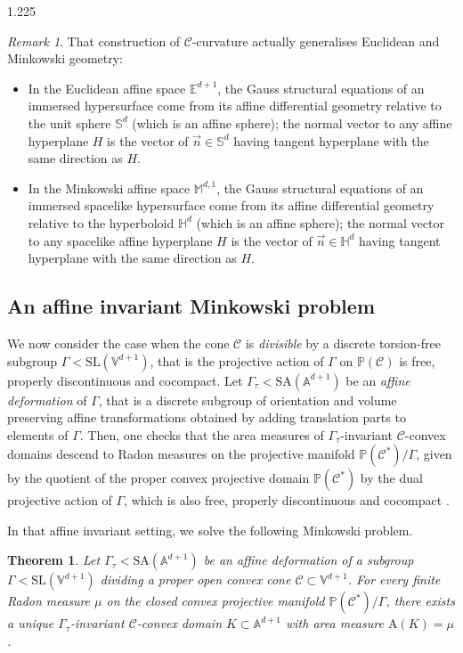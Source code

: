 \documentclass[reqno, a4paper]{amsart}
\numberwithin{equation}{section}
\numberwithin{figure}{section}
\newtheorem{maintheorem}{Theorem}
\theoremstyle{definition}
\theoremstyle{remark}
\newtheorem{remark}[theorem]{Remark}
\newcommand{\V}{\mathbb{V}} %
\newcommand{\A}{\mathbb{A}} %
\renewcommand{\P}{\mathbb{P}} %
\newcommand{\E}{\mathbb{E}} %
\newcommand{\Sph}{\mathbb{S}} %
\renewcommand{\H}{\mathbb{H}} %
\newcommand{\SL}{\mathrm{SL}} %
\newcommand{\SA}{\mathrm{SA}} %
\newcommand{\C}{\mathcal{C}} %
\newcommand{\Area}{\mathrm{A}} %
\begin{document}
\begin{spacing}{1.225}
\begin{remark}
\label{rem intro curvature}
That construction of $\C$-curvature actually generalises Euclidean and Minkowski geometry: 
\begin{itemize}
 \item In the Euclidean affine space $\E^{d+1}$, the Gauss structural equations of an immersed hypersurface come from its affine differential geometry relative to the unit sphere $\Sph^d$ (which is an affine sphere); the normal vector to any affine hyperplane $H$ is the vector of $\vec{n} \in \Sph^d$ having tangent hyperplane with the same direction as $H$. 
 \item In the Minkowski affine space $\mathbb{M}^{d,1}$, the Gauss structural equations of an immersed spacelike hypersurface come from its affine differential geometry relative to the hyperboloid $\H^d$ (which is an affine sphere); the normal vector to any spacelike affine hyperplane $H$ is the vector of $\vec{n} \in \H^d$ having tangent hyperplane with the same direction as $H$. 
\end{itemize}  
\end{remark}

\subsection*{An affine invariant Minkowski problem}

We now consider the case when the cone $\C$ is \emph{divisible} by a discrete torsion-free subgroup $\Gamma < \SL(\V^{d+1})$, that is the projective action of $\Gamma$ on $\P(\C)$ is free, properly discontinuous and cocompact. Let $\Gamma_\tau < \SA(\A^{d+1}) $ be an \emph{affine deformation} of $\Gamma$, that is a discrete subgroup of orientation and volume preserving affine transformations obtained by adding translation parts to elements of $\Gamma$. Then, one checks that the area measures of $\Gamma_\tau$-invariant $\C$-convex domains descend to Radon measures on the projective manifold $\P(\C^*)/\Gamma$, given by the quotient of the proper convex projective domain $\P(\C^*)$ by the dual projective action of $\Gamma$, which is also free, properly discontinuous and cocompact \cite[Lemma~2.8]{Benoist_04}. 

In that affine invariant setting, we solve the following Minkowski problem. 

\begin{maintheorem}
\label{theo intro Minkowski solution}
Let $\Gamma_\tau < \SA(\A^{d+1})$ be an affine deformation of a subgroup $\Gamma < \SL(\V^{d+1})$ dividing a proper open convex cone $\C \subset \V^{d+1}$. For every finite Radon measure $\mu$ on the closed convex projective manifold $\P(\C^*)/\Gamma$, there exists a unique $\Gamma_\tau$-invariant $\C$-convex domain $K \subset \A^{d+1}$ with area measure $\Area(K)=\mu$. 
\end{maintheorem}



\end{spacing}
\end{document}
